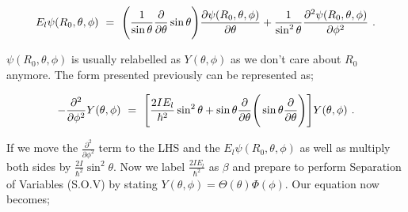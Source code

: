 \documentclass{article}
\begin{document}
\begin{equation} \label{eq:256}
E_l \psi( R_0 , \theta, \phi ) \hspace{0.125cm} = \hspace{0.125cm} \Bigg( \frac{1}{\sin{\theta}} \frac{\partial}{\partial{\theta}}\sin{\theta}\Bigg) \frac{\partial{\psi( R_0 , \theta, \phi )}}{\partial{\theta}} + \frac{1}{\sin^{2}{\theta}} \frac{\partial^{2}{\psi( R_0 , \theta, \phi )}}{\partial{\phi}^{2}} \hspace{0.125cm}. 
\end{equation}

\begin{math} \psi( R_0 , \theta, \phi ) \end{math} is usually relabelled as \begin{math} Y(\theta, \phi ) \end{math} as we don't care about \begin{math} R_0 \end{math} anymore. The form presented previously can be represented as;

\begin{equation} \label{eq:256}
-\frac{\partial^{2}}{\partial{\phi^{2}}} Y(\theta, \phi) \hspace{0.125cm} = \hspace{0.125cm} \Bigg[ \frac{2 I E_l}{\hbar^{2}} \sin^{2} \theta + \sin\theta\frac{\partial}{\partial{\theta}}\Bigg(\sin\theta \frac{\partial}{\partial{\theta}}\Bigg) \Bigg] Y(\theta, \phi) \hspace{0.125cm}. 
\end{equation}

If we move the \begin{math} \frac{\partial^{2}}{\partial{\phi}^{2}} \end{math} term to the LHS and the \begin{math} E_l \psi( R_0 , \theta, \phi ) \end{math} as well as multiply both sides by \begin{math} \frac{2 I}{\hbar^{2}} \sin^{2}\theta \end{math}. Now we label \begin{math} \frac{2 I E_l}{\hbar^{2}} \end{math} as \begin{math} \beta \end{math} and prepare to perform Separation of Variables (S.O.V) by stating \begin{math} Y(\theta,\phi) = \Theta(\theta) \Phi(\phi) \end{math}. Our equation now becomes;
\end{document}
